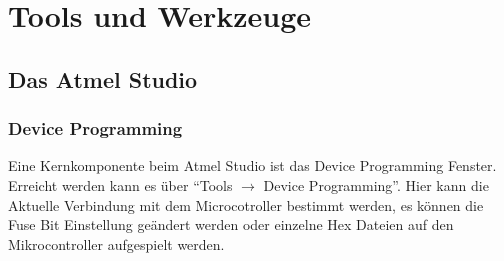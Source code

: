 

\section{Tools und Werkzeuge}

\subsection{Das Atmel Studio}

\subsubsection{Device Programming}

Eine Kernkomponente beim Atmel Studio ist das Device Programming Fenster.
Erreicht werden kann es über "`Tools $\to$  Device Programming"'.
Hier kann die Aktuelle Verbindung mit dem Microcotroller bestimmt werden, es
können die Fuse Bit Einstellung geändert werden oder einzelne Hex
Dateien auf den Mikrocontroller aufgespielt werden.



